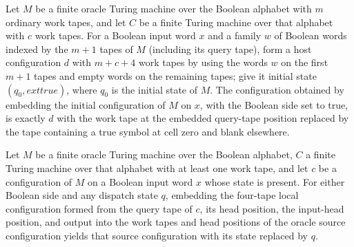 \begin{theorem}
\label{Turing.oracleSourceCfg_initial}
\leanok
{}
Let $M$ be a finite oracle Turing machine over the Boolean alphabet with $m$ ordinary
work tapes, and let $C$ be a finite Turing machine over that alphabet with $c$ work
tapes. For a Boolean input word $x$ and a family $w$ of Boolean words indexed by the
$m+1$ tapes of $M$ (including its query tape), form a host configuration $d$ with
$m+c+4$ work tapes by using the words $w$ on the first $m+1$ tapes and empty words on
the remaining tapes; give it initial state $(q_0,	ext{true})$, where $q_0$ is the
initial state of $M$. The configuration obtained by embedding the initial configuration
of $M$ on $x$, with the Boolean side set to true, is exactly $d$ with the work tape at
the embedded query-tape position replaced by the tape containing a true symbol at cell
zero and blank elsewhere.
\end{theorem}

\begin{theorem}
\label{Turing.oracleSource_localView}
\leanok
{}
Let $M$ be a finite oracle Turing machine over the Boolean alphabet, $C$ a finite Turing
machine over that alphabet with at least one work tape, and let $c$ be a configuration
of $M$ on a Boolean input word $x$ whose state is present. For either Boolean side and
any dispatch state $q$, embedding the four-tape local configuration formed from the
query tape of $c$, its head position, the input-head position, and output into the work
tapes and head positions of the oracle source configuration yields that source
configuration with its state replaced by $q$.
\end{theorem}

